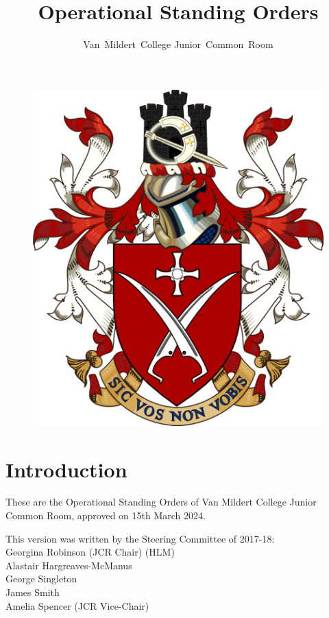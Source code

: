\documentclass[12pt]{article}
\title{Operational Standing Orders}
\author{Van~Mildert~College Junior~Common~Room}
\date{\thedate}
\newcommand{\thedate}{15th March 2024}
\begin{document}
\begin{titlepage}  %
    \maketitle
    \begin{figure}[h]
    \includegraphics[scale=0.5]{arms}  %
    \centering
    \end{figure}
    \thispagestyle{empty}
\end{titlepage}

\setcounter{page}{2}  %
\section*{Introduction}
These are the Operational Standing Orders of Van Mildert College Junior Common Room, approved on \thedate.

This version was written by the Steering Committee of 2017-18:\\
\hspace*{2cm}Georgina Robinson (JCR Chair) (HLM)\\
\hspace*{2cm}Alastair Hargreaves-McManus\\
\hspace*{2cm}George Singleton\\
\hspace*{2cm}James Smith\\
\hspace*{2cm}Amelia Spencer (JCR Vice-Chair)
\end{document}
